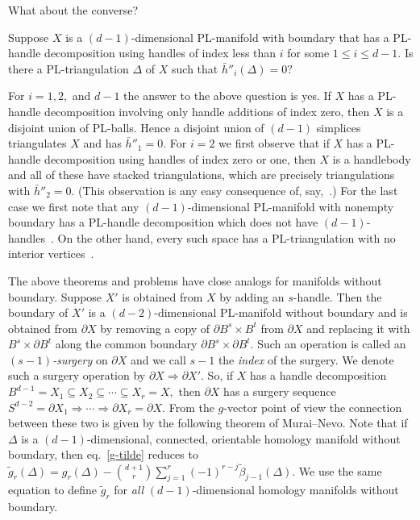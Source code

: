 \documentclass[ALCO,ThmDefs,Unicode,epreuves]{cedram}
\begin{document}
What about the converse?

\begin{ques}
Suppose $X$ is a $(d-1)$-dimensional PL-manifold with boundary that has a PL-handle decomposition using handles of index less than $i$ for some $1 \le i \le d-1.$ Is there a PL-triangulation $\Delta$ of $X$ such that $\bar{h}''_i(\Delta) = 0?$
\end{ques}

 For $i = 1,2,$ and $d-1$ the answer to the above question is yes. If $X$ has a PL-handle decomposition involving only handle additions of index zero, then $X$ is a disjoint union of PL-balls. Hence a disjoint union of $(d-1)$ simplices triangulates $X$ and has $\bar{h}''_1=0.$ For $i=2$ we first observe that if $X$ has a PL-handle decomposition using handles of index zero or one, then $X$ is a handlebody and all of these have stacked triangulations, which are precisely triangulations with $\bar{h}''_2=0$. (This observation is any easy consequence of, say,~\cite[Theorem~4.5]{DattaMurai}.) For the last case we first note that any $(d-1)$-dimensional PL-manifold with nonempty boundary has a PL-handle decomposition which does not have $(d-1)$-handles~\cite[Corollary~6.14~(ii)]{Rourke-Sanderson}. On the other hand, every such space has a PL-triangulation with no interior vertices~\cite[Theorem~1]{Bing}.
 

 
The above theorems and problems have close analogs for manifolds without boundary. Suppose $X'$ is obtained from $X$ by adding an $s$-handle. Then the boundary of $X'$ is a $(d-2)$-dimensional PL-manifold without boundary and is obtained from $\partial X$ by removing a copy of $\partial B^s \times B^t$ from $\partial X$ and replacing it with $B^s \times \partial B^t$ along the common boundary $\partial B^s \times \partial B^t.$ Such an operation is called an \emph{$(s-1)$-surgery} on $\partial X$ and we call $s-1$ the \emph{index} of the surgery. We denote such a surgery operation by $\partial X \Rightarrow \partial X'.$ So, if $X$ has a handle decomposition $B^{d-1} = X_1 \subseteq X_2 \subseteq \cdots \subseteq X_r = X,$ then $\partial X$ has a surgery sequence $S^{d-2}=\partial X_1 \Rightarrow \cdots \Rightarrow \partial X_r=\partial X.$ From the $g$-vector point of view the connection between these two is given by the following theorem of Murai--Nevo. Note that if $\Delta$ is a $(d-1)$-dimensional, connected, orientable homology manifold without boundary, then eq.~\eqref{g-tilde} reduces to $\tilde{g}_r(\Delta)=g_r(\Delta)-\binom{d+1}{r}\sum_{j=1}^r(-1)^{r-j}\tilde{\beta}_{j-1}(\Delta)$. We use the same equation to define $\tilde{g}_r$ for \emph{all} $(d-1)$-dimensional homology manifolds without boundary.
\end{document}
